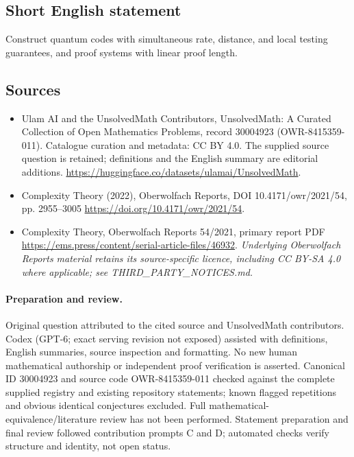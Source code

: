 \documentclass[11pt]{article}
\begin{document}
\subsection{Short English statement}
Construct quantum codes with simultaneous rate, distance, and local testing guarantees, and proof systems with linear proof length.
\subsection{Sources}
\begin{itemize}
\item[\hypertarget{source:30004923:1}{S1}] Ulam AI and the UnsolvedMath Contributors, UnsolvedMath: A Curated Collection of Open Mathematics Problems, record 30004923 (OWR-8415359-011). Catalogue curation and metadata: CC BY 4.0. The supplied source question is retained; definitions and the English summary are editorial additions.
\url{https://huggingface.co/datasets/ulamai/UnsolvedMath}.
\item[\hypertarget{source:30004923:2}{S2}] Complexity Theory (2022), Oberwolfach Reports, DOI 10.4171/owr/2021/54, pp. 2955--3005
\url{https://doi.org/10.4171/owr/2021/54}.
\item[\hypertarget{source:30004923:3}{S3}] Complexity Theory, Oberwolfach Reports 54/2021, primary report PDF
\url{https://ems.press/content/serial-article-files/46932}.
\textit{Underlying Oberwolfach Reports material retains its source-specific licence, including CC BY-SA 4.0 where applicable; see THIRD\_PARTY\_NOTICES.md.}
\end{itemize}
\paragraph{Preparation and review.}
Original question attributed to the cited source and UnsolvedMath contributors. Codex (GPT-6; exact serving revision not exposed) assisted with definitions, English summaries, source inspection and formatting. No new human mathematical authorship or independent proof verification is asserted. Canonical ID 30004923 and source code OWR-8415359-011 checked against the complete supplied registry and existing repository statements; known flagged repetitions and obvious identical conjectures excluded. Full mathematical-equivalence/literature review has not been performed. Statement preparation and final review followed contribution prompts C and D; automated checks verify structure and identity, not open status.
\label{end:30004923}
\end{document}

